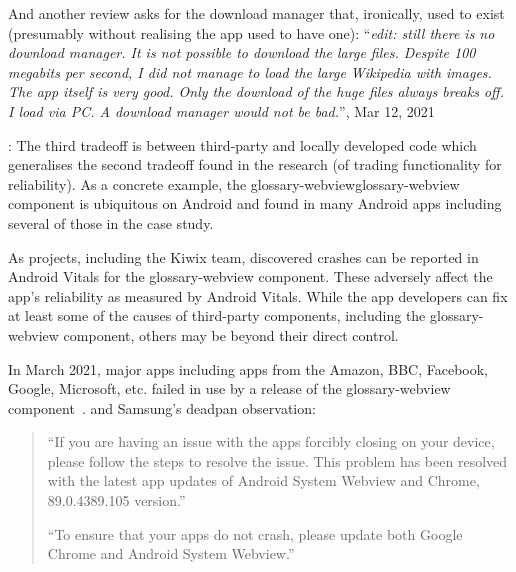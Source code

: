 And another review asks for the download manager that, ironically, used to exist (presumably without realising the app used to have one): ``\textit{edit: still there is no download manager. It is not possible to download the large files. Despite 100 megabits per second, I did not manage to load the large Wikipedia with images. The app itself is very good. Only the download of the huge files always breaks off. I load via PC. A download manager would not be bad.}'', Mar 12, 2021 %

: 
The third tradeoff is between third-party and locally developed code which generalises the second tradeoff found in the research (of trading functionality for reliability). As a concrete example, the \Gls{glossary-webview}\Gls{glossary-webview} component is ubiquitous on Android and found in many Android apps including several of those in the case study. %


As projects, including the Kiwix team, discovered crashes can be reported in Android Vitals for the \Gls{glossary-webview} component. These adversely affect the app's reliability as measured by Android Vitals. While the app developers can fix at least some of the causes of third-party components, including the \Gls{glossary-webview} component, others may be beyond their direct control.

In March 2021, major apps including apps from the Amazon, BBC, Facebook, Google, Microsoft, etc. failed in use by a release of the \Gls{glossary-webview} component~. and Samsung's deadpan observation:

\begin{quote}
    ``If you are having an issue with the apps forcibly closing on your device, please follow the steps to resolve the issue. This problem has been resolved with the latest app updates of Android System Webview and Chrome, 89.0.4389.105 version.''

    ``To ensure that your apps do not crash, please update both Google Chrome and Android System Webview.''~
\end{quote}


